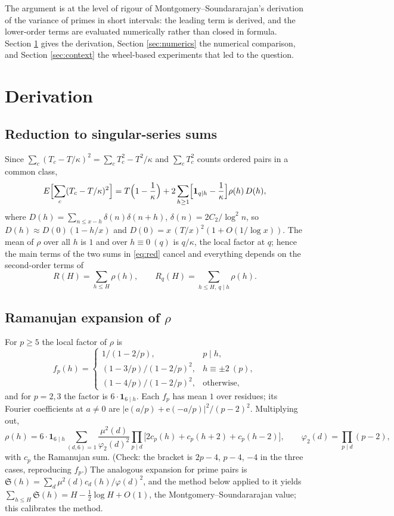 \documentclass[11pt]{article}
\newcommand{\sing}{\mathfrak{S}}
\newcommand{\e}{\mathrm{e}}
\begin{document}
The argument is at the level of rigour of Montgomery--Soundararajan's derivation of the variance of primes in short intervals: the leading term is derived, and the lower-order terms are evaluated numerically rather than closed in formula. Section \ref{sec:derivation} gives the derivation, Section \ref{sec:numerics} the numerical comparison, and Section \ref{sec:context} the wheel-based experiments that led to the question.

\section{Derivation}\label{sec:derivation}

\subsection{Reduction to singular-series sums}
Since $\sum_c(T_c-T/\kappa)^2=\sum_cT_c^2-T^2/\kappa$ and $\sum_cT_c^2$ counts ordered pairs in a common class,
\begin{equation}\label{eq:red}
E\Bigl[\sum_c (T_c-T/\kappa)^2\Bigr]=T\Bigl(1-\frac1\kappa\Bigr)+2\sum_{h\ge1}\Bigl[\mathbf 1_{q\mid h}-\frac1\kappa\Bigr]\rho(h)\,D(h),
\end{equation}
where $D(h)=\sum_{n\le x-h}\delta(n)\delta(n+h)$, $\delta(n)=2C_2/\log^2n$, so $D(h)\approx D(0)(1-h/x)$ and $D(0)=x\,(T/x)^2(1+O(1/\log x))$. The mean of $\rho$ over all $h$ is $1$ and over $h\equiv0\ (q)$ is $q/\kappa$, the local factor at $q$; hence the main terms of the two sums in \eqref{eq:red} cancel and everything depends on the second-order terms of
\[
R(H)=\sum_{h\le H}\rho(h),\qquad R_q(H)=\sum_{h\le H,\ q\mid h}\rho(h).
\]

\subsection{Ramanujan expansion of $\rho$}
For $p\ge5$ the local factor of $\rho$ is
\[
f_p(h)=\begin{cases}1/(1-2/p), & p\mid h,\\ (1-3/p)/(1-2/p)^2, & h\equiv\pm2\ (p),\\ (1-4/p)/(1-2/p)^2, & \text{otherwise},\end{cases}
\]
and for $p=2,3$ the factor is $6\cdot\mathbf 1_{6\mid h}$. Each $f_p$ has mean $1$ over residues; its Fourier coefficients at $a\ne0$ are $|\e(a/p)+\e(-a/p)|^2/(p-2)^2$. Multiplying out,
\begin{equation}\label{eq:ram}
\rho(h)=6\cdot\mathbf 1_{6\mid h}\sum_{(d,6)=1}\frac{\mu^2(d)}{\varphi_2(d)^2}\prod_{p\mid d}\bigl[2c_p(h)+c_p(h+2)+c_p(h-2)\bigr],\qquad \varphi_2(d)=\prod_{p\mid d}(p-2),
\end{equation}
with $c_p$ the Ramanujan sum. (Check: the bracket is $2p-4$, $p-4$, $-4$ in the three cases, reproducing $f_p$.) The analogous expansion for prime pairs is $\sing(h)=\sum_d\mu^2(d)c_d(h)/\varphi(d)^2$, and the method below applied to it yields $\sum_{h\le H}\sing(h)=H-\frac12\log H+O(1)$, the Montgomery--Soundararajan value; this calibrates the method.
\end{document}
